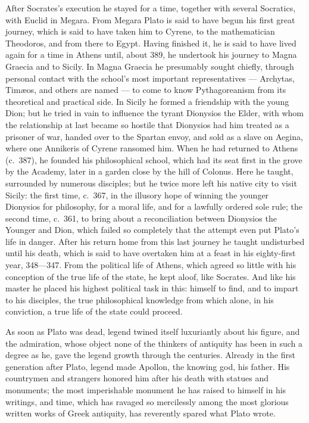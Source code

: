 After Socrates's execution he stayed for a time, together with several
Socratics, with Euclid in Megara. From Megara Plato is said to
have begun his first great journey, which is said to have taken him to
Cyrene, to the mathematician Theodoros, and from there to Egypt. Having
finished it, he is said to have lived again for a time in Athens until,
about 389, he undertook his journey to Magna Graecia and to Sicily. In
Magna Graecia he presumably sought chiefly, through personal contact with
the school's most important representatives --- Archytas, Timæos, and
others are named --- to come to know Pythagoreanism from its theoretical and
practical side. In Sicily he formed a friendship with the young Dion; but he
tried in vain to influence the tyrant Dionysios the Elder, with whom the
relationship at last became so hostile that Dionysios had him treated as a
prisoner of war, handed over to the Spartan envoy, and sold as a slave on
Aegina, where one Annikeris of Cyrene ransomed him. When he had returned to
Athens (c.\ 387), he founded his philosophical school, which had its seat
first in the grove by the Academy, later in a garden close by the hill of
Colonus. Here he taught, surrounded by numerous disciples; but he twice more
left his native city to visit Sicily: the first time, c.\ 367, in the
illusory hope of winning the younger Dionysios for philosophy, for a moral
life, and for a lawfully ordered sole rule; the second time, c.\ 361, to
bring about a reconciliation between Dionysios the Younger and Dion, which
failed so completely that the attempt even put Plato's life in danger.
After his return home from this last journey he taught undisturbed until his
death, which is said to have overtaken him at a feast in his eighty-first
year, 348---347. From the political life of Athens, which agreed so little
with his conception of the true life of the state, he kept aloof, like
Socrates. And like his master he placed his highest political task in this:
himself to find, and to impart to his disciples, the true philosophical
knowledge from which alone, in his conviction, a true life of the state
could proceed.

As soon as Plato was dead, legend twined itself luxuriantly about his
figure, and the admiration, whose object none of the thinkers of antiquity
has been \setcounter{footnote}{0}in such a degree as he, gave the
legend growth through the centuries. Already in the first generation after
Plato, legend made Apollon, the knowing god, his father. His countrymen and
strangers honored him after his death with statues and monuments; the most
imperishable monument he has raised to himself in his writings, and time,
which has ravaged so mercilessly among the most glorious written works of
Greek antiquity, has reverently spared what Plato wrote.


